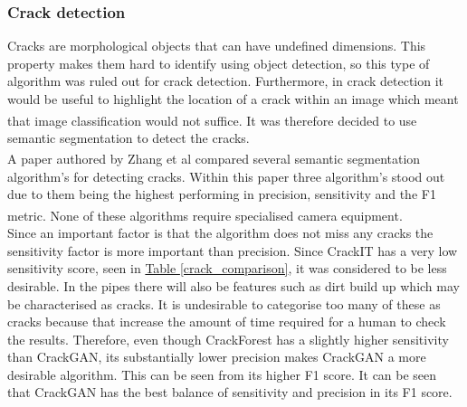 \documentclass[11pt]{article}		%
\newcommand{\supercite}[1]{\textsuperscript{\cite{#1}}}		%
\newcommand{\tableref}[1]{\hyperref[#1]{Table \ref*{#1}}}     %
\begin{document}
		\subsubsection{Crack detection}
		Cracks are morphological objects that can have undefined dimensions. This property makes them hard to identify using object detection, so this type of algorithm was ruled out for crack detection. Furthermore, in crack detection it would be useful to highlight the location of a crack within an image which meant that image classification would not suffice.\supercite{morphological} It was therefore decided to use semantic segmentation to detect the cracks. 
		\\ \hspace*{3ex}
		A paper authored by Zhang et al\supercite{CrackGAN1} compared several semantic segmentation algorithm’s for detecting cracks. Within this paper three algorithm’s stood out due to them being the highest performing in precision, sensitivity and the F1 metric.\supercite{CrackGAN1} None of these algorithms require specialised camera equipment.
			\\

    	    Since an important factor is that the algorithm does not miss any cracks the sensitivity factor is more important than precision. Since CrackIT has a very low sensitivity score, seen in \tableref{crack_comparison}, it was considered to be less desirable. In the pipes there will also be features such as dirt build up which may be characterised as cracks. It is undesirable to categorise too many of these as cracks because that increase the amount of time required for a human to check the results. Therefore, even though CrackForest has a slightly higher sensitivity than CrackGAN, its substantially lower precision makes CrackGAN a more desirable algorithm. This can be seen from its higher F1 score. It can be seen that CrackGAN has the best balance of sensitivity and precision in its F1 score. 
            	        	       
\end{document}
